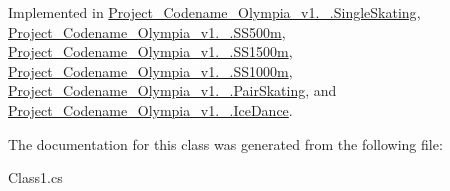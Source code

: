 Implemented in \hyperlink{classProject__Codename__Olympia__v1_1_1__0_1_1SingleSkating_a481a432870964cfce7c319572c794a55}{Project\+\_\+\+Codename\+\_\+\+Olympia\+\_\+v1.\+\_.\+Single\+Skating}, \hyperlink{classProject__Codename__Olympia__v1_1_1__0_1_1SS500m_a11d698b484f98493d11661d43fa3ec12}{Project\+\_\+\+Codename\+\_\+\+Olympia\+\_\+v1.\+\_.\+S\+S500m}, \hyperlink{classProject__Codename__Olympia__v1_1_1__0_1_1SS1500m_af87bf024ce84968289b999323d1a53bb}{Project\+\_\+\+Codename\+\_\+\+Olympia\+\_\+v1.\+\_.\+S\+S1500m}, \hyperlink{classProject__Codename__Olympia__v1_1_1__0_1_1SS1000m_a4cb7d76aed8d478577e243b187ce4830}{Project\+\_\+\+Codename\+\_\+\+Olympia\+\_\+v1.\+\_.\+S\+S1000m}, \hyperlink{classProject__Codename__Olympia__v1_1_1__0_1_1PairSkating_abc9c2d9765ad831e59228697a334da6d}{Project\+\_\+\+Codename\+\_\+\+Olympia\+\_\+v1.\+\_.\+Pair\+Skating}, and \hyperlink{classProject__Codename__Olympia__v1_1_1__0_1_1IceDance_ac95be9763d66943baf87f4533b9b2e64}{Project\+\_\+\+Codename\+\_\+\+Olympia\+\_\+v1.\+\_.\+Ice\+Dance}.



The documentation for this class was generated from the following file\+:\begin{DoxyCompactItemize}
\item 
Class1.\+cs\end{DoxyCompactItemize}

